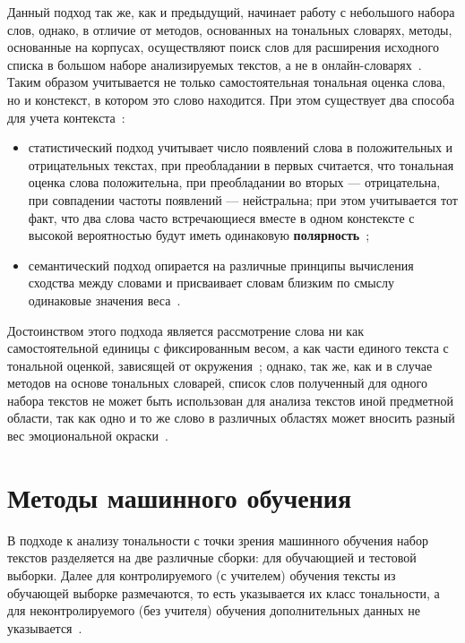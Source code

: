Данный подход так же, как и предыдущий, начинает работу с небольшого набора
слов, однако, в отличие от методов, основанных на тональных словарях, методы,
основанные на корпусах, осуществляют поиск слов для расширения исходного списка
в большом наборе анализируемых текстов, а не в онлайн-словарях~\cite{article2}.
Таким образом учитывается не только самостоятельная тональная оценка слова, но и
констекст, в котором это слово находится. При этом существует
два способа для учета контекста~\cite{article16}:
\begin{itemize}
    \item статистический подход учитывает число появлений слова в положительных
        и отрицательных текстах, при преобладании в первых считается, что
        тональная оценка слова положительна, при преобладании во вторых ---
        отрицательна, при совпадении частоты появлений --- нейстральна; при этом
        учитывается тот факт, что два слова часто встречающиеся вместе в одном
        констексте с высокой вероятностью будут иметь одинаковую
        \textbf{полярность}~\cite{article20};
    \item семантический подход опирается на различные принципы вычисления
        сходства между словами и присваивает словам близким по смыслу одинаковые
        значения веса~\cite{article20}.
\end{itemize}

Достоинством этого подхода является рассмотрение слова ни как самостоятельной
единицы с фиксированным весом, а как части единого текста с тональной оценкой,
зависящей от окружения~\cite{article2}; однако, так же, как и в случае методов
на основе тональных словарей, список слов полученный для одного набора текстов
не может быть использован для анализа текстов иной предметной области, так как
одно и то же слово в различных областях может вносить разный вес эмоциональной
окраски~\cite{article9}.


\section{Методы машинного обучения}

В подходе к анализу тональности с точки зрения машинного обучения набор
текстов разделяется на две различные сборки: для обучающией и тестовой выборки.
Далее для контролируемого (с учителем) обучения тексты из обучающей
выборке размечаются, то есть указывается их класс тональности, а для
неконтролируемого (без учителя) обучения дополнительных данных не
указывается~\cite{article18}.

